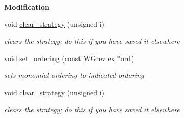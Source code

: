 \begin{Indent}\textbf{ Modification}\par
\begin{DoxyCompactItemize}
\item 
\mbox{\label{group___g_b_computation_ac006310b3318fa247fa9a415db495d06}} 
void \hyperlink{group___g_b_computation_ac006310b3318fa247fa9a415db495d06}{clear\+\_\+strategy} (unsigned i)
\begin{DoxyCompactList}\small\item\em clears the strategy; do this if you have saved it elsewhere \end{DoxyCompactList}\item 
\mbox{\label{group___g_b_computation_a727863db45a812f5dccc3f1d3be3a745}} 
void \hyperlink{group___g_b_computation_a727863db45a812f5dccc3f1d3be3a745}{set\+\_\+ordering} (const \hyperlink{group__orderinggroup_class_w_grevlex}{W\+Grevlex} $\ast$ord)
\begin{DoxyCompactList}\small\item\em sets monomial ordering to indicated ordering \end{DoxyCompactList}\item 
\mbox{\label{group___g_b_computation_ac006310b3318fa247fa9a415db495d06}} 
void \hyperlink{group___g_b_computation_ac006310b3318fa247fa9a415db495d06}{clear\+\_\+strategy} (unsigned i)
\begin{DoxyCompactList}\small\item\em clears the strategy; do this if you have saved it elsewhere \end{DoxyCompactList}\end{DoxyCompactItemize}
\end{Indent}

